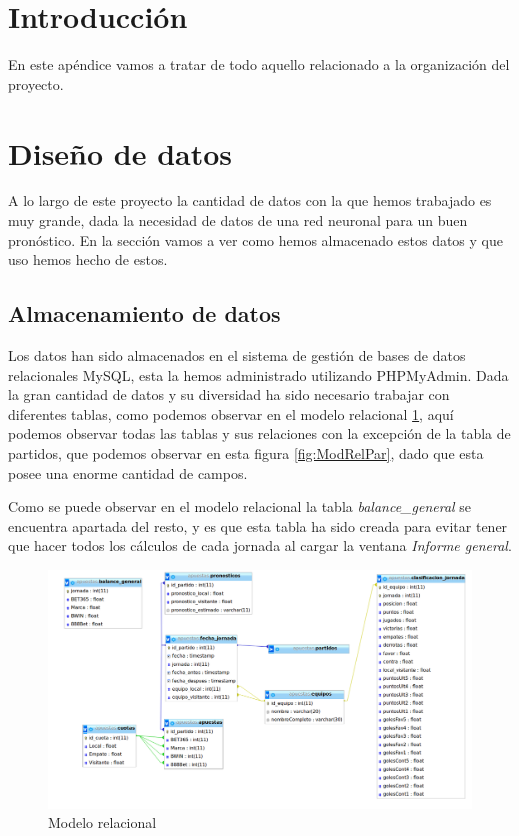 
\section{Introducción}

En este apéndice vamos a tratar de todo aquello relacionado a la organización del proyecto.

\section{Diseño de datos}

A lo largo de este proyecto la cantidad de datos con la que hemos trabajado es muy grande, dada la necesidad de datos de una red neuronal para un buen pronóstico. En la sección vamos a ver como hemos almacenado estos datos y que uso hemos hecho de estos.

\subsection{Almacenamiento de datos}

Los datos han sido almacenados en el sistema de gestión de bases de datos relacionales MySQL, esta  la hemos administrado utilizando PHPMyAdmin. Dada la gran cantidad de datos y su diversidad ha sido necesario trabajar con diferentes tablas, como podemos observar en el modelo relacional \ref{fig:ModRel}, aquí podemos observar todas las tablas y sus relaciones con la excepción de la tabla de partidos, que podemos observar en esta figura \ref{fig:ModRelPar}, dado que esta posee una enorme cantidad de campos.

Como se puede observar en el modelo relacional la tabla \textit{balance\_general} se encuentra apartada del resto, y es que esta tabla ha sido creada para evitar tener que hacer todos los cálculos de cada jornada al cargar la ventana \textit{Informe general}.

\begin{figure}
\centering
\includegraphics[width=.9\textwidth]{img/modelo_relacional}
\caption{Modelo relacional}
\label{fig:ModRel}
\end{figure}

